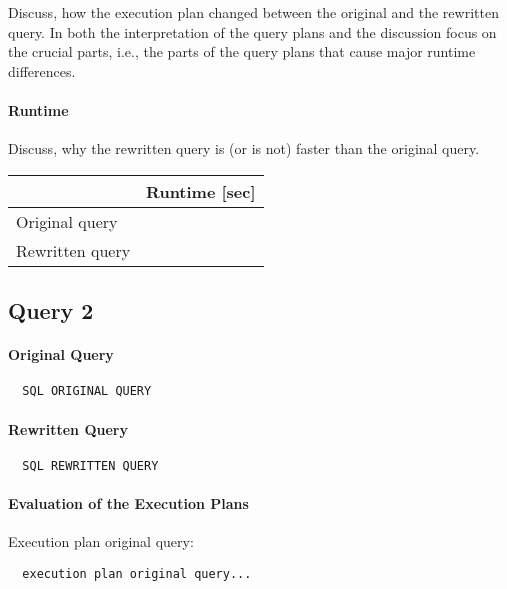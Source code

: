 \documentclass[11pt]{scrartcl}
\begin{document}
Discuss, how the execution plan changed between the original and the
rewritten query. In both the interpretation of the query plans and the
discussion focus on the crucial parts, i.e., the parts of the query
plans that cause major runtime differences.

\paragraph{Runtime} Discuss, why the rewritten query is (or is not)
faster than the original query.


\begin{table}[H]
  \begin{tabular}{l|r}
    & Runtime [sec] \\
   \hline
    Original query & \\
    Rewritten query & \\
  \end{tabular}
\end{table}

\subsection*{Query 2}

\paragraph{Original Query}

{\small
\begin{verbatim}
  SQL ORIGINAL QUERY
\end{verbatim}
}

\paragraph{Rewritten Query}

{\small
\begin{verbatim}
  SQL REWRITTEN QUERY
\end{verbatim}
}

\paragraph{Evaluation of the Execution Plans}

Execution plan original query:

\begin{verbatim}
  execution plan original query...
\end{verbatim}
\end{document}
